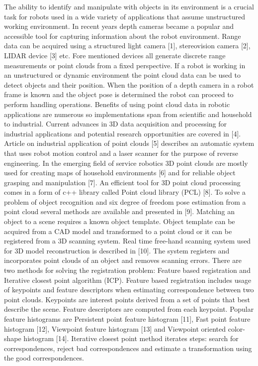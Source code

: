 \documentclass[10]{article}
\begin{document}
The ability to identify and manipulate with objects in its environment is a crucial task for robots used in a wide variety of applications that assume unstructured working environment. In recent years depth cameras became a popular and accessible tool for capturing information about the robot environment. Range data can be acquired using a structured light camera [1], stereovision camera [2], LIDAR device [3] etc. Fore mentioned devices all generate discrete range measurements or point clouds from a fixed perspective. If a robot is working in an unstructured or dynamic environment the point cloud data can be used to detect objects and their position. When the position of a depth camera in a robot frame is known and the object pose is determined the robot can proceed to perform handling operations. Benefits of using point cloud data in robotic applications are numerous so implementations span from scientific and household to industrial. Current advances in 3D data acquisition and processing for industrial applications and potential research opportunities are covered in [4]. Article on industrial application of point clouds [5] describes an automatic system that uses robot motion control and a laser scanner for the purpose of reverse engineering. In the emerging field of service robotics 3D point clouds are mostly used for creating maps of household environments [6] and for reliable object grasping and manipulation [7]. An efficient tool for 3D point cloud processing comes in a form of c++ library called Point cloud library (PCL) [8]. To solve a problem of object recognition and six degree of freedom pose estimation from a point cloud several methods are available and presented in [9]. Matching an object to a scene requires a known object template. Object template can be acquired from a CAD model and transformed to a point cloud or it can be registered from a 3D scanning system. Real time free-hand scanning system used for 3D model reconstruction is described in [10]. The system registers and incorporates point clouds of an object and removes scanning errors. There are two methods for solving the registration problem: Feature based registration and Iterative closest point algorithm (ICP). Feature based registration includes usage of keypoints and feature descriptors when estimating correspondence between two point clouds. Keypoints are interest points derived from a set of points that best describe the scene. Feature descriptors are computed from each keypoint. Popular feature histograms are Persistent point feature histogram [11], Fast point feature histogram [12], Viewpoint feature histogram [13] and Viewpoint oriented color-shape histogram [14]. 
Iterative closest point method iterates steps: search for correspondences, reject bad correspondences and estimate a transformation using the good correspondences.
\end{document}
